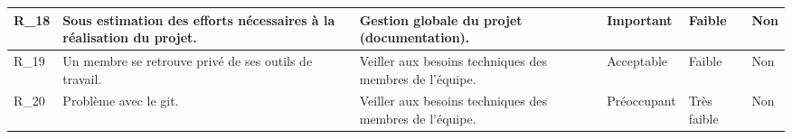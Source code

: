 \documentclass{../../res/univ-projet}
\begin{document}
\begin{flushleft}
\begin{tabular}{| p{1.4cm} | p{4cm} | p{4cm} | p{1.7cm} | p{1.6cm} | p{1.2cm} |}
	  		R\_18 & Sous estimation des efforts nécessaires à la réalisation du projet. & Gestion globale du projet (documentation). 					& Important 	& Faible 		& \cellcolor{green} Non\\ \hline
	  		R\_19 & Un membre se retrouve privé de ses outils de travail. 				& Veiller aux besoins techniques des membres de l'équipe.		& Acceptable 	& Faible 		& \cellcolor{green} Non\\ \hline
	  		R\_20 & Problème avec le git. 												& Veiller aux besoins techniques des membres de l'équipe.	 	 & Préoccupant	 & Très faible 	 & \cellcolor{green} Non\\ \hline
		\end{tabular}
	\end{flushleft}

\end{document}

